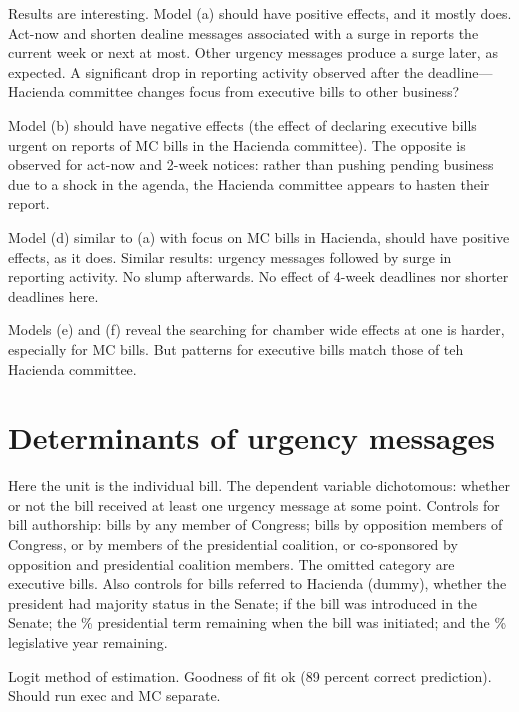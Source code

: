 \documentclass[letter,12pt]{article}
\begin{document}
Results are interesting. Model (a) should have positive effects, and it mostly does. Act-now and shorten dealine messages associated with a surge in reports the current week or next at most. Other urgency messages produce a surge later, as expected. A significant drop in reporting activity observed after the deadline---Hacienda committee changes focus from executive bills to other business?  

Model (b) should have negative effects (the effect of declaring executive bills urgent on reports of MC bills in the Hacienda committee). The opposite is observed for act-now and 2-week notices: rather than pushing pending business due to a shock in the agenda, the Hacienda committee appears to hasten their report.  

Model (d) similar to (a) with focus on MC bills in Hacienda, should have positive effects, as it does. Similar results: urgency messages followed by surge in reporting activity. No slump afterwards. No effect of 4-week deadlines nor shorter deadlines here. 

Models (e) and (f) reveal the searching for chamber wide effects at one is harder, especially for MC bills. But patterns for executive bills match those of teh Hacienda committee.  


\section{Determinants of urgency messages}

Here the unit is the individual bill. The dependent variable dichotomous: whether or not the bill received at least one urgency message at some point. Controls for bill authorship: bills by any member of Congress; bills by opposition members of Congress, or by members of the presidential coalition, or co-sponsored by opposition and presidential coalition members. The omitted category are executive bills. Also controls for bills referred to Hacienda (dummy), whether the president had majority status in the Senate; if the bill was introduced in the Senate; the \% presidential term remaining when the bill was initiated; and the \% legislative year remaining. 

Logit method of estimation. Goodness of fit ok (89 percent correct prediction). Should run exec and MC separate. 
\end{document}
